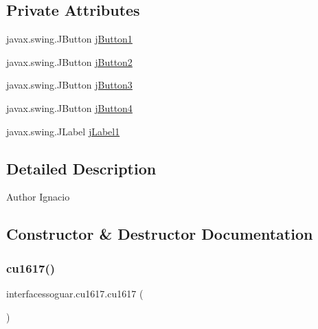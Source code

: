 \subsection*{Private Attributes}
\begin{DoxyCompactItemize}
\item 
javax.\+swing.\+J\+Button \mbox{\hyperlink{classinterfacessoguar_1_1cu1617_a50f641f67c27a9b417d476ee81a6d982}{j\+Button1}}
\item 
javax.\+swing.\+J\+Button \mbox{\hyperlink{classinterfacessoguar_1_1cu1617_a47c3aa6c8836a1ff965ecef05f6d0e2f}{j\+Button2}}
\item 
javax.\+swing.\+J\+Button \mbox{\hyperlink{classinterfacessoguar_1_1cu1617_ab6bee6d7b3c436f015dc73e19b861fe4}{j\+Button3}}
\item 
javax.\+swing.\+J\+Button \mbox{\hyperlink{classinterfacessoguar_1_1cu1617_a8a8f5dee729cb00cabe4a95e51011050}{j\+Button4}}
\item 
javax.\+swing.\+J\+Label \mbox{\hyperlink{classinterfacessoguar_1_1cu1617_ae976dd2eb4ea08817085c2704c78c3ef}{j\+Label1}}
\end{DoxyCompactItemize}


\subsection{Detailed Description}
\begin{DoxyAuthor}{Author}
Ignacio 
\end{DoxyAuthor}


\subsection{Constructor \& Destructor Documentation}
\mbox{\label{classinterfacessoguar_1_1cu1617_a372c757ba474fc10b267c6722f3a6f1c}} 
\subsubsection{\texorpdfstring{cu1617()}{cu1617()}}
{\footnotesize\ttfamily interfacessoguar.\+cu1617.\+cu1617 (\begin{DoxyParamCaption}{ }\end{DoxyParamCaption})\hspace{0.3cm}{\ttfamily [inline]}}

